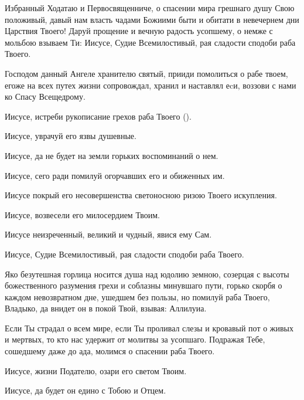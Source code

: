\begin{mymulticols}

\newcommand{\akafistZaEdinKondakOne}{%
\mysubtitle{Кондак 1}

Избранный Ходатаю и Первосвященниче, о спасении мира грешнаго душу Свою положивый, давый нам власть чадами Божиими быти и обитати в невечернем дни Царствия Твоего! Даруй прощение и вечную радость усопшему, о немже с мольбою взываем Ти: Иисусе, Судие Всемилостивый, рая сладости сподоби раба Твоего.
}

\newcommand{\akafistZaEdinIkosOne}{%
\mysubtitle{Икос 1}

Господом данный Ангеле хранителю святый, прииди помолиться о рабе твоем, егоже на всех путех жизни сопровождал, хранил и наставлял еcи, воззови с нами ко Спасу Всещедрому. 

Иисусе, истреби рукописание грехов раба Твоего (\myemph{ имярек}). 

Иисусе, уврачуй его язвы душевные. 

Иисусе, да не будет на земли горьких воспоминаний о нем. 

Иисусе, сего ради помилуй огорчавших его и обиженных им. 

Иисусе покрый его несовершенства светоносною ризою Твоего искупления. 

Иисусе, возвесели его милосердием Твоим. 

Иисусе неизреченный, великий и чудный, явися ему Сам. 

Иисусе, Судие Всемилостивый, рая сладости сподоби раба Твоего.
}

\akafistZaEdinKondakOne

\akafistZaEdinIkosOne


Яко безутешная горлица носится душа над юдолию земною, созерцая с высоты божественного разумения грехи и соблазны минувшаго пути, горько скорбя о каждом невозвратном дне, ушедшем без пользы, но помилуй раба Твоего, Владыко, да внидет он в покой Твой, взывая: Аллилуиа.


Если Ты страдал о всем мире, если Ты проливал слезы и кровавый пот о живых и мертвых, то кто нас удержит от молитвы за усопшаго. Подражая Тебе, сошедшему даже до ада, молимся о спасении раба Твоего. 

Иисусе, жизни Подателю, озари его светом Твоим. 

Иисусе, да будет он едино с Тобою и Отцем. 


\end{mymulticols}
